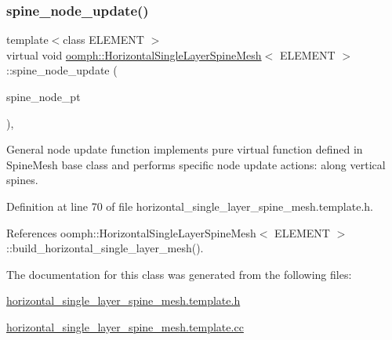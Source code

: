 \subsubsection{\texorpdfstring{spine\+\_\+node\+\_\+update()}{spine\_node\_update()}}
{\footnotesize\ttfamily template$<$class E\+L\+E\+M\+E\+NT $>$ \\
virtual void \hyperlink{classoomph_1_1HorizontalSingleLayerSpineMesh}{oomph\+::\+Horizontal\+Single\+Layer\+Spine\+Mesh}$<$ E\+L\+E\+M\+E\+NT $>$\+::spine\+\_\+node\+\_\+update (\begin{DoxyParamCaption}\item[{Spine\+Node $\ast$}]{spine\+\_\+node\+\_\+pt }\end{DoxyParamCaption})\hspace{0.3cm}{\ttfamily [inline]}, {\ttfamily [virtual]}}



General node update function implements pure virtual function defined in Spine\+Mesh base class and performs specific node update actions\+: along vertical spines. 



Definition at line 70 of file horizontal\+\_\+single\+\_\+layer\+\_\+spine\+\_\+mesh.\+template.\+h.



References oomph\+::\+Horizontal\+Single\+Layer\+Spine\+Mesh$<$ E\+L\+E\+M\+E\+N\+T $>$\+::build\+\_\+horizontal\+\_\+single\+\_\+layer\+\_\+mesh().



The documentation for this class was generated from the following files\+:\begin{DoxyCompactItemize}
\item 
\hyperlink{horizontal__single__layer__spine__mesh_8template_8h}{horizontal\+\_\+single\+\_\+layer\+\_\+spine\+\_\+mesh.\+template.\+h}\item 
\hyperlink{horizontal__single__layer__spine__mesh_8template_8cc}{horizontal\+\_\+single\+\_\+layer\+\_\+spine\+\_\+mesh.\+template.\+cc}\end{DoxyCompactItemize}
